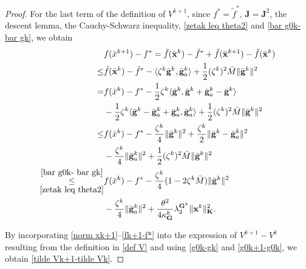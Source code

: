 \documentclass[12pt,draftcls,onecolumn]{IEEEtran}
\renewcommand{\Re}{{\mathbb{R}}}
\begin{document}
\begin{proof}
 
For the last term of the definition of $V^{k+1}$, since $f^* = \tilde{f}^*$, $\mathbf{J}=\mathbf{J}^2$, the descent lemma, the Cauchy-Schwarz inequality, \eqref{zetak leq theta2} and \eqref{bar g0k- bar gk}, we obtain
\vspace{-0.1cm}
\begin{align}
	&f(\bar{x}^{k+1}) - f^*=  \tilde{f}(\bar{\mathbf{x}}^{k}) - \tilde{f}^* + \tilde{f}(\bar{\mathbf{x}}^{k+1}) - \tilde{f}(\bar{\mathbf{x}}^{k}) \notag\\
	\leq & \tilde{f}(\bar{\mathbf{x}}^{k}) - \tilde{f}^* - \langle {\zeta^k}\bar{\mathbf{g}}^k, \bar{\mathbf{g}}_a^k \rangle + \frac{1}{2}(\zeta^k)^2\bar{M}\|\bar{\mathbf{g}}^k\|^2\notag\\
	= & f(\bar{x}^k) -f^* - \frac{1}{2}{\zeta^k}\langle \bar{\mathbf{g}}^k, \bar{\mathbf{g}}^k +\bar{\mathbf{g}}_a^k -\bar{\mathbf{g}}^k \rangle \notag\\
	&- \frac{1}{2}{\zeta^k}\langle \bar{\mathbf{g}}^k -\bar{\mathbf{g}}_a^k+\bar{\mathbf{g}}_a^k, \bar{\mathbf{g}}^k_a  \rangle + \frac{1}{2}(\zeta^k)^2\bar{M}\|\bar{\mathbf{g}}^k\|^2\notag\\
	\leq & f(\bar{x}^k) -f^* - \frac{{\zeta^k}}{4}\|\bar{\mathbf{g}}^k\|^2 + \frac{{\zeta^k}}{2} \|\bar{\mathbf{g}}^k -\bar{\mathbf{g}}_a^k\|^2\notag\\
	&  - \frac{{\zeta^k}}{4}\|\bar{\mathbf{g}}_a^k\|^2+ \frac{1}{2}(\zeta^k)^2\bar{M}\|\bar{\mathbf{g}}^k\|^2 \notag\\
	\underset{\eqref{zetak leq theta2}}{\overset{\eqref{bar g0k- bar gk}}{\leq}} & f(\bar{x}^k) -f^* - \frac{{\zeta^k}}{4}(1-2{\zeta^k}\bar{M})\|\bar{\mathbf{g}}^k\|^2 \notag\\
	&- \frac{{\zeta^k}}{4}\|\bar{\mathbf{g}}_a^k\|^2 + \frac{\theta^2}{4\kappa_{\mathbf{G}}^k}\lambda_{2}^{\mathbf{G}^k}\|\mathbf{x}^k\|^2_{\mathbf{K}}.
	\label{fk+1-f*}
\end{align}

By incorporating \eqref{norm xk+1}--\eqref{fk+1-f*} into the expression of $V^{k+1}-V^k$ resulting from the definition in \eqref{def V} and using \eqref{g0k-gk} and \eqref{g0k+1-g0k}, we obtain \eqref{tilde Vk+1-tilde Vk}.
\end{proof}
\end{document}
